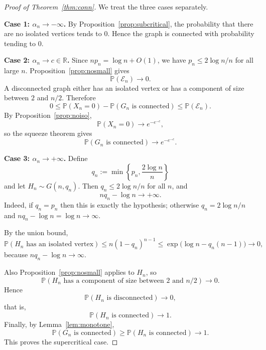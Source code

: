 \documentclass[11pt]{article}
\newcommand{\PP}{\mathbb{P}}
\theoremstyle{plain}
\theoremstyle{definition}
\begin{document}
\begin{proof}[Proof of Theorem~\ref{thm:conn}]
We treat the three cases separately.

\smallskip
\textbf{Case 1: $\alpha_n\to -\infty$.}
By Proposition~\ref{prop:subcritical}, the probability that there are no isolated vertices tends to $0$.  Hence the graph is connected with probability tending to $0$.

\smallskip
\textbf{Case 2: $\alpha_n\to c\in\mathbb{R}$.}
Since $np_n=\log n + O(1)$, we have $p_n\le 2\log n/n$ for all large $n$.  Proposition~\ref{prop:nosmall} gives
\[
\PP(\mathcal{E}_n)\to 0.
\]
A disconnected graph either has an isolated vertex or has a component of size between $2$ and $n/2$.  Therefore
\[
0
\le
\PP(X_n=0) - \PP(G_n\text{ is connected})
\le
\PP(\mathcal{E}_n).
\]
By Proposition~\ref{prop:noiso},
\[
\PP(X_n=0)\to e^{-e^{-c}},
\]
so the squeeze theorem gives
\[
\PP(G_n\text{ is connected})\to e^{-e^{-c}}.
\]

\smallskip
\textbf{Case 3: $\alpha_n\to +\infty$.}
Define
\[
q_n := \min\!\left\{p_n,\frac{2\log n}{n}\right\}
\]
and let $H_n\sim G(n,q_n)$.  Then $q_n\le 2\log n/n$ for all $n$, and
\[
nq_n - \log n \to +\infty.
\]
Indeed, if $q_n=p_n$ then this is exactly the hypothesis; otherwise $q_n=2\log n/n$ and $nq_n-\log n = \log n\to\infty$.

By the union bound,
\[
\PP(H_n\text{ has an isolated vertex})
\le
n(1-q_n)^{n-1}
\le
\exp\bigl(\log n - q_n(n-1)\bigr)
\to 0,
\]
because $nq_n-\log n\to\infty$.

Also Proposition~\ref{prop:nosmall} applies to $H_n$, so
\[
\PP(H_n\text{ has a component of size between }2\text{ and }n/2)\to 0.
\]
Hence
\[
\PP(H_n\text{ is disconnected})\to 0,
\]
that is,
\[
\PP(H_n\text{ is connected})\to 1.
\]
Finally, by Lemma~\ref{lem:monotone},
\[
\PP(G_n\text{ is connected})
\ge
\PP(H_n\text{ is connected})
\to 1.
\]
This proves the supercritical case.
\end{proof}
\end{document}
